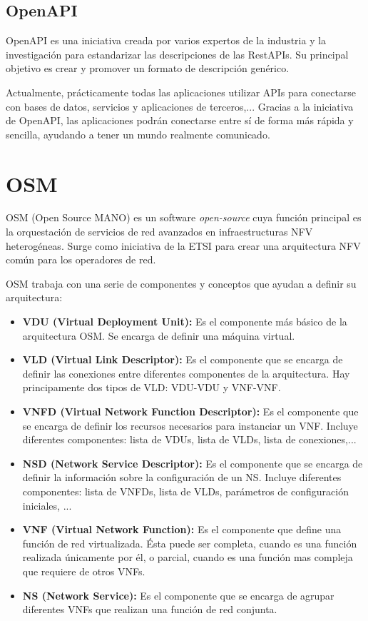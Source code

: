 \subsection{OpenAPI}
\label{subsec:openapi}

OpenAPI es una iniciativa creada por varios expertos de la industria y la investigación para estandarizar las descripciones de las RestAPIs. Su principal objetivo es crear y promover un formato de descripción genérico.

Actualmente, prácticamente todas las aplicaciones utilizar APIs para conectarse con bases de datos, servicios y aplicaciones de terceros,... Gracias a la iniciativa de OpenAPI, las aplicaciones podrán conectarse entre sí de forma más rápida y sencilla, ayudando a tener un mundo realmente comunicado.

\section{OSM}
\label{sec:osm}

OSM (Open Source MANO) es un software \textit{open-source} cuya función principal es la orquestación de servicios de red avanzados en infraestructuras NFV heterogéneas. Surge como iniciativa de la ETSI para crear una arquitectura NFV común para los operadores de red.

OSM trabaja con una serie de componentes y conceptos que ayudan a definir su arquitectura:

\begin{itemize}
	\item \textbf{VDU (Virtual Deployment Unit):} Es el componente más básico de la arquitectura OSM. Se encarga de definir una máquina virtual. 
	
	\item \textbf{VLD (Virtual Link Descriptor):} Es el componente que se encarga de definir las conexiones entre diferentes componentes de la arquitectura. Hay principamente dos tipos de VLD: VDU-VDU y VNF-VNF.
	
	\item \textbf{VNFD (Virtual Network Function Descriptor):} Es el componente que se encarga de definir los recursos necesarios para instanciar un VNF. Incluye diferentes componentes: lista de VDUs, lista de VLDs, lista de conexiones,...
	
	\item \textbf{NSD (Network Service Descriptor):} Es el componente que se encarga de definir la información sobre la configuración de un NS. Incluye diferentes componentes: lista de VNFDs, lista de VLDs, parámetros de configuración iniciales, ...
	
	\item \textbf{VNF (Virtual Network Function):} Es el componente que define una función de red virtualizada. Ésta puede ser completa, cuando es una función realizada únicamente por él, o parcial, cuando es una función mas compleja que requiere de otros VNFs.
	
	\item \textbf{NS (Network Service):} Es el componente que se encarga de agrupar diferentes VNFs que realizan una función de red conjunta.
\end{itemize}

